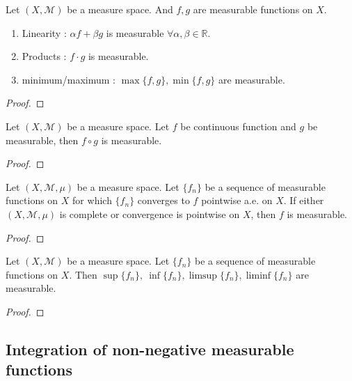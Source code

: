 \begin{theorem}
	Let $(X,\mathcal{M})$ be a measure space. And $f,g$ are measurable functions on $X$.
	\begin{enumerate}
		\item Linearity : $\alpha f + \beta g$ is measurable $\forall \alpha,\beta \in \mathbb{R}$.
		\item Products : $f \cdot g$ is measurable.
		\item minimum/maximum : $\max\{f,g\}, \min\{f,g\}$ are measurable.
	\end{enumerate}
\end{theorem}
\begin{proof}
\end{proof}

\begin{theorem}
	Let $(X,\mathcal{M})$ be a measure space.
	Let $f$ be continuous function and $g$ be measurable, then $f \circ g$ is measurable.
\end{theorem}
\begin{proof}
\end{proof}

\begin{theorem}
	Let $(X,\mathcal{M},\mu)$ be a measure space.
	Let $\{ f_n \}$ be a sequence of measurable functions on $X$ for which $\{ f_n \}$ converges to $f$ pointwise a.e. on $X$.
	If either $(X,\mathcal{M},\mu)$ is complete or convergence is pointwise on $X$, then $f$ is measurable.
\end{theorem}
\begin{proof}
\end{proof}

\begin{corollary}
	Let $(X,\mathcal{M})$ be a measure space.
	Let $\{ f_n \}$ be a sequence of measurable functions on $X$.
	Then $\sup\{f_n\},\ \inf\{f_n\},\limsup\{f_n\},\liminf\{f_n\}$ are measurable.
\end{corollary}
\begin{proof}
\end{proof}


\subsection{Integration of non-negative measurable functions}
